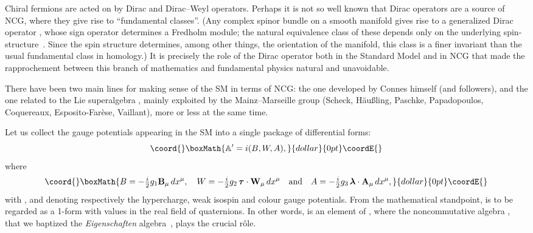 \documentclass[a4paper,12pt]{article}
\providecommand{\A}{\mathcal{A}}        %
\renewcommand{\AA}{\mathbb{A}}      %
\providecommand{\C}{\mathbb{C}}         %
\providecommand{\HH}{\mathbb{H}}        %
\providecommand{\La}{\Lambda}           %
\providecommand{\lab}{\boldsymbol{\lambda}} %
\providecommand{\ox}{\otimes}           %
\providecommand{\sul}{\mathfrak{su}}    %
\providecommand{\taub}{\boldsymbol{\tau}} %
\providecommand{\tihalf}{\tfrac{i}{2}}  %
\providecommand{\1}{\mathbf{1}}         %
\providecommand{\7}{\dagger}            %
\providecommand{\8}{\bullet}            %
\renewcommand{\.}{\cdot}            %
\renewcommand{\:}{\colon}           %
\begin{document}
Chiral fermions are acted on by Dirac and Dirac--Weyl operators.
Perhaps it is not so well known that Dirac operators are a source of
NCG, where they give rise to ``fundamental classes''. (Any complex
spinor bundle on a smooth manifold gives rise to a generalized Dirac
operator \coordHE{}, whose sign operator \coordHE{} determines a
Fredholm module; the natural equivalence class of these depends only
on the underlying spin\coordHE{}-structure~\cite{HigsonR}. Since the
spin\coordHE{} structure determines, among other things, the orientation of
the manifold, this class is a finer invariant than the usual
fundamental class in homology.) It is precisely the role of the Dirac
operator both in the Standard Model and in NCG that made the
rapprochement between this branch of mathematics and fundamental
physics natural and unavoidable.

There have been two main lines for making sense of the SM in terms of
NCG: the one developed by Connes himself (and followers), and the one
related to the Lie superalgebra \myHighlight{$\sul(2|1)$}\coordHE{}, mainly exploited by the
Mainz--Marseille group (Scheck, H\"au{\ss}ling, Paschke, Papadopoulos,
Coquereaux, Esposito-Far\`ese, Vaillant), more or less at the
same time.

Let us collect the gauge potentials appearing in the SM into a single
package of differential forms:
$$\coord{}\boxMath{
\AA' = i(B,W,A),
}{dollar}{0pt}\coordE{}$$
where
$$\coord{}\boxMath{
B = -\tihalf g_1 \mathbf{B}_\mu \,dx^\mu, \quad
W = -\tihalf g_2\,\taub \cdot \mathbf{W}_\mu \,dx^\mu
\quad{\rm and}
\quad A = -\tihalf g_3\,\lab \cdot \mathbf{A}_\mu\,dx^\mu,
}{dollar}{0pt}\coordE{}$$
with \coordHE{}, \coordHE{} and \coordHE{} denoting respectively
the hypercharge, weak isospin and colour gauge potentials. From the
mathematical standpoint, \coordHE{} is to be regarded as a 1-form with values
in the real field \myHighlight{$\HH$}\coordHE{} of quaternions. In other words, \myHighlight{$\AA'$}\coordHE{} is an
element of \myHighlight{$\La^1(M) \ox \A_F$}\coordHE{}, where the noncommutative algebra
\myHighlight{$\A_F := \C \oplus \HH \oplus M_3(\C)$}\coordHE{}, that we baptized the 
\textit{Eigenschaften\/} algebra~\cite{Cordelia}, plays the crucial
r\^ole.
\end{document}
